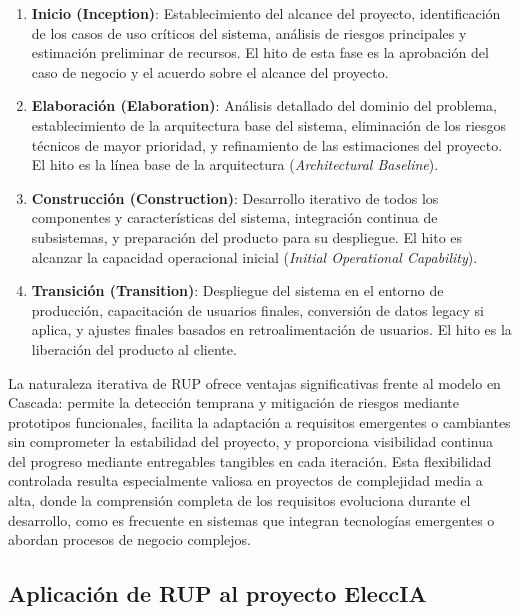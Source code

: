 \documentclass[12pt,a4paper,oneside]{book}
\begin{document}
\begin{enumerate}
    \item \textbf{Inicio (Inception)}: Establecimiento del alcance del proyecto, identificación de los casos de uso críticos del sistema, análisis de riesgos principales y estimación preliminar de recursos. El hito de esta fase es la aprobación del caso de negocio y el acuerdo sobre el alcance del proyecto.

    \item \textbf{Elaboración (Elaboration)}: Análisis detallado del dominio del problema, establecimiento de la arquitectura base del sistema, eliminación de los riesgos técnicos de mayor prioridad, y refinamiento de las estimaciones del proyecto. El hito es la línea base de la arquitectura (\textit{Architectural Baseline}).

    \item \textbf{Construcción (Construction)}: Desarrollo iterativo de todos los componentes y características del sistema, integración continua de subsistemas, y preparación del producto para su despliegue. El hito es alcanzar la capacidad operacional inicial (\textit{Initial Operational Capability}).

    \item \textbf{Transición (Transition)}: Despliegue del sistema en el entorno de producción, capacitación de usuarios finales, conversión de datos legacy si aplica, y ajustes finales basados en retroalimentación de usuarios. El hito es la liberación del producto al cliente.
\end{enumerate}

La naturaleza iterativa de RUP ofrece ventajas significativas frente al modelo en Cascada: permite la detección temprana y mitigación de riesgos mediante prototipos funcionales, facilita la adaptación a requisitos emergentes o cambiantes sin comprometer la estabilidad del proyecto, y proporciona visibilidad continua del progreso mediante entregables tangibles en cada iteración. Esta flexibilidad controlada resulta especialmente valiosa en proyectos de complejidad media a alta, donde la comprensión completa de los requisitos evoluciona durante el desarrollo, como es frecuente en sistemas que integran tecnologías emergentes o abordan procesos de negocio complejos.

\subsection{Aplicación de RUP al proyecto EleccIA}
\label{subsec:aplicacion-rup}
\end{document}
